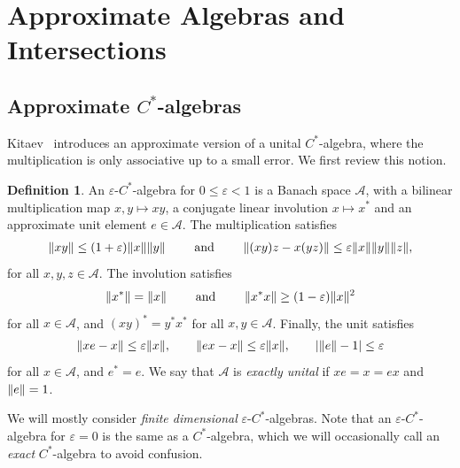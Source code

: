 \documentclass[11pt,reqno]{amsart}
\theoremstyle{definition}
\newtheorem{definition}[theorem]{Definition}
\theoremstyle{remark}
\numberwithin{equation}{section}
\newcommand{\eps}{\varepsilon}
\newcommand{\cA}{\mathcal A}
\DeclarePairedDelimiter\abs{\lvert}{\rvert}
\DeclarePairedDelimiter\norm{\lVert}{\rVert}
\begin{document}
\section{Approximate Algebras and Intersections}\label{sec:approx algebras}

\subsection{Approximate \texorpdfstring{$C^*$}{C*}-algebras}
Kitaev~\cite{kitaev2024almost} introduces an approximate version of a unital $C^*$-algebra, where the multiplication is only associative up to a small error.
We first review this notion.

\begin{definition}\label{dfn:approx algebra}
    An $\eps$-$C^*$-algebra for $0 \leq \eps < 1$ is a Banach space $\cA$, with a bilinear multiplication map $x , y \mapsto xy$, a conjugate linear involution $x \mapsto x^*$ and an approximate unit element $e \in \cA$. The multiplication satisfies
    \begin{align*}
        \norm{xy}            \leq (1 + \eps) \norm{x}\norm{y} \qquad\text{ and }\qquad
        \norm{(xy)z - x(yz)} \leq \eps \norm{x} \norm{y} \norm{z},
    \end{align*}
    for all $x, y, z \in \cA$.
    The involution satisfies
    \begin{align*}
        \norm{x^*} = \norm{x} \qquad \text{ and } \qquad \norm{x^* x} \geq (1 - \eps) \norm{x}^2
    \end{align*}
    for all $x \in \cA$, and $(xy)^* = y^* x^*$ for all $x,y \in \cA$.
    Finally, the unit satisfies
    \begin{align*}
        \norm{xe - x} \leq \eps\norm{x}, \qquad \norm{ex - x} \leq \eps\norm{x}, \qquad \abs{\norm{e} - 1} \leq \eps
    \end{align*}
    for all $x \in \cA$, and $e^* = e$.
    We say that $\cA$ is \emph{exactly unital} if $xe = x = ex$ and $\norm{e} = 1$.
\end{definition}

We will mostly consider \emph{finite dimensional} $\eps$-$C^*$-algebras.
Note that an $\eps$-$C^*$-algebra for $\eps = 0$ is the same as a $C^*$-algebra, which we will occasionally call an \emph{exact} $C^*$-algebra to avoid confusion.
\end{document}
